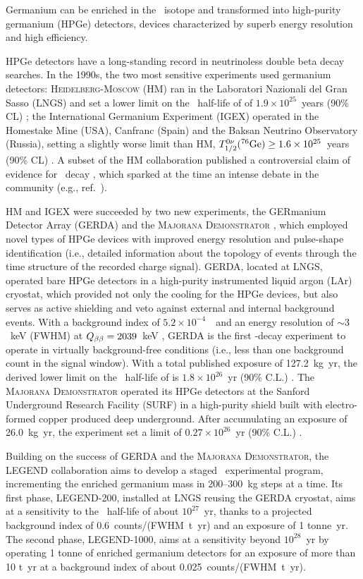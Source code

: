 %
Germanium can be enriched in the \bb\ isotope and transformed into high-purity germanium (HPGe) detectors, devices characterized by superb energy resolution and high efficiency. 

HPGe detectors have a long-standing record in neutrinoless double beta decay searches. In the 1990s, the two most sensitive experiments used germanium detectors: \textsc{Heidelberg-Moscow} (HM) ran in the Laboratori Nazionali del Gran Sasso (LNGS) and set a lower limit on the \bbonu\ half-life of  of $1.9 \times 10^{25}$~years (90\% CL) \cite{Klapdor-Kleingrothaus:2000eir}; the International Germanium Experiment (IGEX) operated in the Homestake Mine (USA), Canfranc (Spain) and the Baksan Neutrino Observatory (Russia), setting a slightly worse limit than HM, $T^{0\nu}_{1/2}(^{76}\mathrm{Ge}) \geq 1.6 \times 10^{25}$~years (90\% CL) \cite{IGEX:2002bce}. A subset of the HM collaboration published a controversial claim of evidence for \bbonu\ decay \cite{Klapdor-Kleingrothaus:2001oba, Klapdor-Kleingrothaus:2006zcr}, which sparked at the time an intense debate in the community (e.g., ref.~\cite{Aalseth:2002dt}). 

HM and IGEX were succeeded by two new experiments, the GERmanium Detector Array (GERDA) \cite{GERDA:2020xhi} and the \textsc{Majorana Demonstrator} \cite{Majorana:2019nbd}, which employed novel types of HPGe devices with improved energy resolution and pulse-shape identification (i.e., detailed information about the topology of events through the time structure of the recorded charge signal). GERDA, located at LNGS, operated bare HPGe detectors in a high-purity instrumented liquid argon (LAr) cryostat, which provided not only the cooling for the HPGe devices, but also serves as active shielding and veto against external and internal background events. With a background index of $5.2\times10^{-4}$~\ckky\  and an energy resolution of $\sim3$~keV (FWHM) at $Q_{\beta\beta}=2039$~keV \cite{GERDA:2020xhi}, GERDA is the first \bbonu-decay experiment to operate in virtually background-free conditions (i.e., less than one background count in the signal window). With a total published exposure of 127.2~kg~yr, the derived lower limit on the \bbonu\ half-life of  is $1.8\times10^{26}$~yr (90\% C.L.) \cite{GERDA:2020xhi}. The \textsc{Majorana Demonstrator} operated its HPGe detectors at the Sanford Underground Research Facility (SURF) in a high-purity shield built with electro-formed copper produced deep underground. After accumulating an exposure of 26.0~kg~yr, the experiment set a limit of $0.27\times10^{26}$~yr (90\% C.L.) \cite{Majorana:2019nbd}.

Building on the success of GERDA and the \textsc{Majorana Demonstrator}, the LEGEND collaboration aims to develop a staged \bbonu\ experimental program, incrementing the enriched germanium mass in 200--300~kg steps at a time. Its first phase, LEGEND-200, installed at LNGS reusing the GERDA cryostat, aims at a sensitivity to the \bbonu\ half-life of about $10^{27}$~yr, thanks to a projected background index of 0.6~counts/(FWHM~t~yr) and an exposure of 1 tonne~yr. The second phase, LEGEND-1000, aims at a sensitivity beyond $10^{28}$~yr by operating 1 tonne of enriched germanium detectors for an exposure of more than 10 t~yr at a background index of about 0.025~counts/(FWHM~t~yr). 
